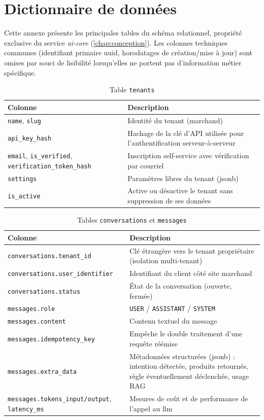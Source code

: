 \chapter{Dictionnaire de données}
\label{annexe:donnees}

Cette annexe présente les principales tables du schéma relationnel, propriété exclusive du service \emph{ai-core} (\cref{chap:conception}). Les colonnes techniques communes (identifiant primaire \gls{uuid}, horodatages de création/mise à jour) sont omises par souci de lisibilité lorsqu'elles ne portent pas d'information métier spécifique.

\begin{table}[h]
\centering
\caption{Table \texttt{tenants}}
\begin{tabular}{@{}p{4cm}p{11cm}@{}}
\toprule
\textbf{Colonne} & \textbf{Description} \\
\midrule
\texttt{name}, \texttt{slug} & Identité du tenant (marchand) \\
\texttt{api\_key\_hash} & Hachage de la clé d'API utilisée pour l'authentification serveur-à-serveur \\
\texttt{email}, \texttt{is\_verified}, \texttt{verification\_token\_hash} & Inscription self-service avec vérification par courriel \\
\texttt{settings} & Paramètres libres du tenant (\gls{jsonb}) \\
\texttt{is\_active} & Active ou désactive le tenant sans suppression de ses données \\
\bottomrule
\end{tabular}
\end{table}

\begin{table}[h]
\centering
\caption{Tables \texttt{conversations} et \texttt{messages}}
\begin{tabular}{@{}p{4cm}p{11cm}@{}}
\toprule
\textbf{Colonne} & \textbf{Description} \\
\midrule
\texttt{conversations.tenant\_id} & Clé étrangère vers le tenant propriétaire (isolation multi-tenant) \\
\texttt{conversations.user\_identifier} & Identifiant du client côté site marchand \\
\texttt{conversations.status} & État de la conversation (ouverte, fermée) \\
\texttt{messages.role} & \texttt{USER} / \texttt{ASSISTANT} / \texttt{SYSTEM} \\
\texttt{messages.content} & Contenu textuel du message \\
\texttt{messages.idempotency\_key} & Empêche le double traitement d'une requête réémise \\
\texttt{messages.extra\_data} & Métadonnées structurées (\gls{jsonb}) : intention détectée, produits retournés, règle éventuellement déclenchée, usage RAG \\
\texttt{messages.tokens\_input/output}, \texttt{latency\_ms} & Mesures de coût et de performance de l'appel au \gls{llm} \\
\bottomrule
\end{tabular}
\end{table}

